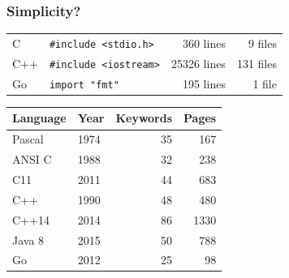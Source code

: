\documentclass[handout,compress,t,11pt]{beamer}
\begin{document}
\begin{frame}
    \frametitle{Simplicity?}
    \begin{table}[h!]
        \begin{tabular}{llrr}
            C & {\tt \#include <stdio.h>} & 360 lines & 9 files \\
            C++ & {\tt \#include <iostream>} & 25326 lines & 131 files \\
            Go & {\tt import "fmt"} & 195 lines & 1 file\:\: \\
        \end{tabular}
    \end{table}    
    \begin{table}[h!]
        \begin{tabular}{l||l|r|r}
        \textbf{Language} & \textbf{Year} & \textbf{Keywords} & \textbf{Pages} \\
        \hline \hline
        Pascal     & 1974     & 35 & 167  \\
        \hline
        ANSI C     & 1988     & 32 & 238  \\
        C11        & 2011     & 44 & 683  \\
        \hline
        C++        & 1990     & 48 & 480  \\
        C++14      & 2014     & 86 & 1330 \\
        \hline
        Java 8     & 2015     & 50 & 788  \\
        \hline
        Go         & 2012     & 25 & 98   \\
        \end{tabular}
    \end{table}
\end{frame}
\end{document}
